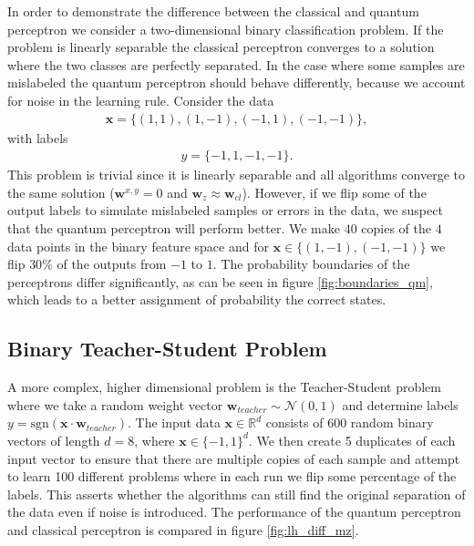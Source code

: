 In order to demonstrate the difference between the classical and quantum perceptron we consider a two-dimensional binary classification problem. If the problem is linearly separable the classical perceptron converges to a solution where the two classes are perfectly separated. In the case where some samples are mislabeled the quantum perceptron should behave differently, because we account for noise in the learning rule. Consider the data 
\begin{align*}
    \mathbf{x} = \{(1,1), (1,-1), (-1,1), (-1,-1) \},
\end{align*} 
with labels 
\begin{align*}
    y = \{-1,1,-1,-1\}.
\end{align*}  
This problem is trivial since it is linearly separable and all algorithms converge to the same solution ($\mathbf{w}^{x,y}=0$ and $\mathbf{w}_z \approx \mathbf{w}_{cl}$). However, if we flip some of the output labels to simulate mislabeled samples or errors in the data, we suspect that the quantum perceptron will perform better. We make $40$ copies of the $4$  data points in the binary feature space and for $\mathbf{x}\in \{(1,-1),(-1,-1)\}$ we flip $30\%$ of the outputs from $-1$ to $1$. The probability boundaries of the perceptrons differ significantly, as can be seen in figure \ref{fig:boundaries_qm}, which leads to a better assignment of probability the correct states. 

\subsection{Binary Teacher-Student Problem}

A more complex, higher dimensional problem is the Teacher-Student problem where we take a random weight vector $\mathbf{w}_{teacher} \sim \mathcal{N}(0,1)$ and determine labels $y = \text{sgn}(\mathbf{x} \cdot \mathbf{w}_{teacher})$. The input data $\mathbf{x}\in \mathbb{R}^d$ consists of 600 random binary vectors of length $d=8$, where $\mathbf{x}\in\{-1, 1\}^d$. We then create 5 duplicates of each input vector to ensure that there are multiple copies of each sample and attempt to learn 100 different problems where in each run we flip some percentage of the labels. This asserts whether the algorithms can still find the original separation of the data even if noise is introduced. The performance of the quantum perceptron and classical perceptron is compared in figure \ref{fig:lh_diff_mz}.


